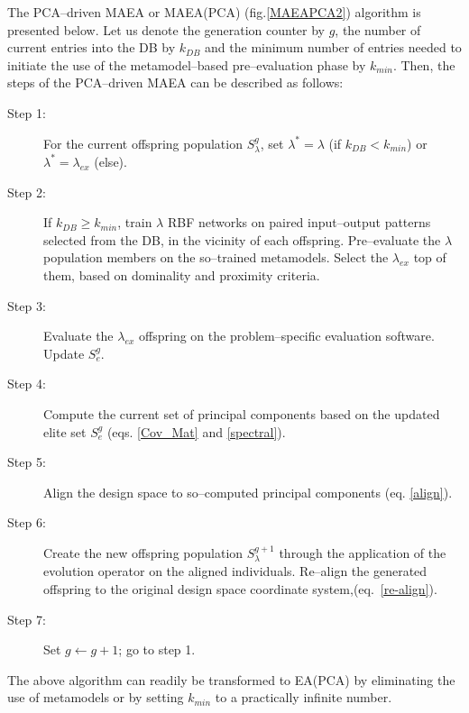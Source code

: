 The PCA--driven MAEA or MAEA(PCA) (fig.\ref{MAEAPCA2}) algorithm is presented below. 
Let us denote the generation counter by $g$, the number of current entries into the DB by $k_{DB}$ and the minimum number of entries needed to initiate the use of the metamodel--based pre--evaluation phase by $k_{min}$. Then, the steps of the PCA--driven MAEA can be described as follows:
\begin{description}
  \item[Step 1:] For the current offspring population $S^{g}_\lambda$, set $\lambda^*\!=\!\lambda$ (if $k_{DB}\!<\!k_{min}$) or  $\lambda^*\!=\!\lambda_{ex}$ (else). 
  \item[Step 2:] If $k_{DB}\!\ge\!k_{min}$, train $\lambda$ RBF networks on paired input--output patterns selected from the DB, in the vicinity of each offspring. Pre--evaluate the $\lambda$ population members on the so--trained metamodels. Select the $\lambda_{ex}$ top of them, based on dominality and proximity criteria.
  \item[Step 3:] Evaluate the $\lambda_{ex}$ offspring on the problem--specific evaluation software. Update $S^{g}_e$.
  \item[Step 4:] Compute the current set of principal components based on the updated elite set $S^{g}_e$ (eqs. \ref{Cov_Mat} and \ref{spectral}).
  \item[Step 5:] Align the design space to so--computed principal components (eq. \ref{align}). 
  \item[Step 6:] Create the new offspring population $S^{g+1}_\lambda$ through the application of the evolution operator on the aligned individuals. Re--align the generated offspring to the original design space coordinate system,(eq.~\ref{re-align}).
  \item[Step 7:] Set $g\!\leftarrow\!g\!+\!1$; go to step 1.
\end{description}
The above algorithm can readily be transformed to EA(PCA) by eliminating the use of metamodels or by setting $k_{min}$ to a practically infinite number.  


